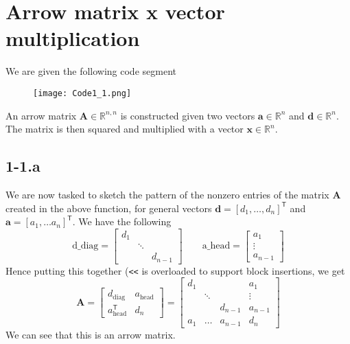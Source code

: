 \documentclass{article}
\begin{document}
\section*{Arrow matrix x vector multiplication}
We are given the following code segment
\begin{figure}[!hbt]
    \centering
\texttt{[image: Code1\_1.png]}
\end{figure}
An arrow matrix $\mathbf{A}\in \mathbb{R}^{n,n}$ is constructed given two vectors $\mathbf{a}\in \mathbb{R}^{n}$ and $\mathbf{d}\in \mathbb{R}^{n}$. The matrix is then squared and multiplied with a vector $\mathbf{x}\in \mathbb{R}^{n}$.
\subsection*{1-1.a} We are now tasked to sketch the pattern of the nonzero entries of the matrix $\mathbf{A}$ created in the above function, for general vectors $\mathbf{d} = \left[d_{1}, \dots, d_{n}\right]^{\mathsf{T}}$ and $\mathbf{a} = \left[a_{1}, \dots a_{n}\right]^{\mathsf{T}}$. We have the following
\begin{equation*}
    \text{d\_diag} = 
    \begin{bmatrix}
       d_{1} & & \\
       & \ddots & \\
       & & d_{n-1}
    \end{bmatrix}
    \qquad
    \text{a\_head} = 
    \begin{bmatrix}
    a_{1} \\
    \vdots \\
    a_{n-1}
    \end{bmatrix}
\end{equation*}
Hence putting this together (\verb|<<| is overloaded to support block insertions, we get
\begin{equation*}
    \mathbf{A} = 
    \begin{bmatrix}
    d_{\text{diag}} & a_{\text{head}} \\
    a_{\text{head}}^{\mathsf{T}} & d_{n}
    \end{bmatrix} = 
    \begin{bmatrix}
        d_{1} & & & a_{1} \\
           &\ddots& &\vdots \\
         &  & d_{n-1}& a_{n-1}\\
        a_{1} & \dots & a_{n-1}& d_{n}
    \end{bmatrix}
\end{equation*}
We can see that this is an arrow matrix.
\end{document}
